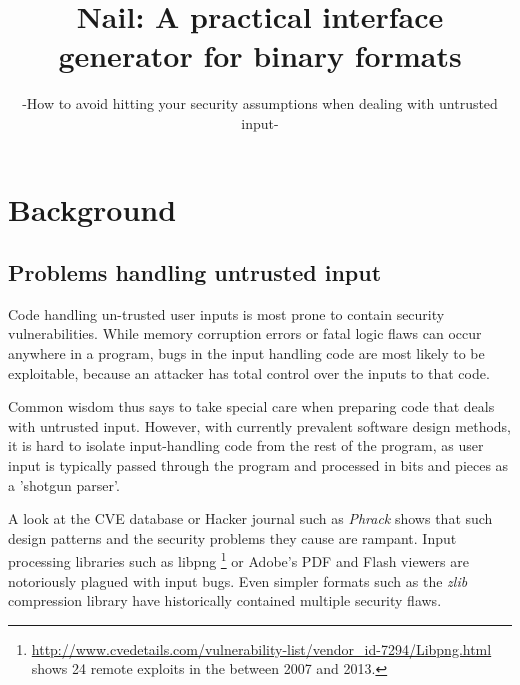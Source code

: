 \documentclass{article}
\begin{document}

\title{Nail: A practical interface generator for binary formats} \subtitle{-How to avoid hitting
  your security assumptions when dealing with untrusted input-}


\section{Background}


\subsection{Problems handling untrusted input}
Code handling un-trusted user inputs is most prone to contain security vulnerabilities. While memory
corruption errors or fatal logic flaws can occur anywhere in a program, bugs in the input handling
code are most likely to be exploitable, because an attacker has total control over the inputs to
that code. 

Common wisdom thus says to take special care when preparing code that deals with untrusted input.
However, with currently prevalent software design methods, it is hard to isolate input-handling code
from the rest of the program, as user input is typically passed through the program and processed in
bits and pieces as a 'shotgun parser'\cite{shotgun-parser}.  

A look at the CVE database or Hacker journal such as \textit{Phrack} shows that such design patterns
and the security problems they cause are rampant. Input processing libraries such as libpng
\footnote{\url{http://www.cvedetails.com/vulnerability-list/vendor_id-7294/Libpng.html} shows 24
remote exploits in the between 2007 and 2013.} or Adobe's PDF and Flash viewers are notoriously
plagued with input bugs. Even simpler formats such as the \textit{zlib} compression library have
historically contained multiple security
flaws.
\end{document}
